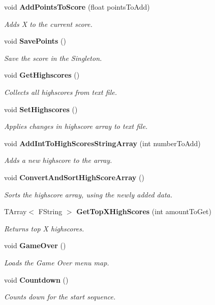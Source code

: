 \begin{DoxyCompactItemize}
void \textbf{ Add\+Points\+To\+Score} (float points\+To\+Add)
\begin{DoxyCompactList}\small\item\em Adds X to the current score. \end{DoxyCompactList}\item 
void \textbf{ Save\+Points} ()
\begin{DoxyCompactList}\small\item\em Save the score in the Singleton. \end{DoxyCompactList}\item 
void \textbf{ Get\+Highscores} ()
\begin{DoxyCompactList}\small\item\em Collects all highscores from text file. \end{DoxyCompactList}\item 
void \textbf{ Set\+Highscores} ()
\begin{DoxyCompactList}\small\item\em Applies changes in highscore array to text file. \end{DoxyCompactList}\item 
void \textbf{ Add\+Int\+To\+High\+Scores\+String\+Array} (int number\+To\+Add)
\begin{DoxyCompactList}\small\item\em Adds a new highscore to the array. \end{DoxyCompactList}\item 
void \textbf{ Convert\+And\+Sort\+High\+Score\+Array} ()
\begin{DoxyCompactList}\small\item\em Sorts the highscore array, using the newly added data. \end{DoxyCompactList}\item 
T\+Array$<$ F\+String $>$ \textbf{ Get\+Top\+X\+High\+Scores} (int amount\+To\+Get)
\begin{DoxyCompactList}\small\item\em Returns top X highscores. \end{DoxyCompactList}\item 
void \textbf{ Game\+Over} ()
\begin{DoxyCompactList}\small\item\em Loads the Game Over menu map. \end{DoxyCompactList}\item 
void \textbf{ Countdown} ()
\begin{DoxyCompactList}\small\item\em Counts down for the start sequence. \end{DoxyCompactList}\item 

\end{DoxyCompactItemize}
